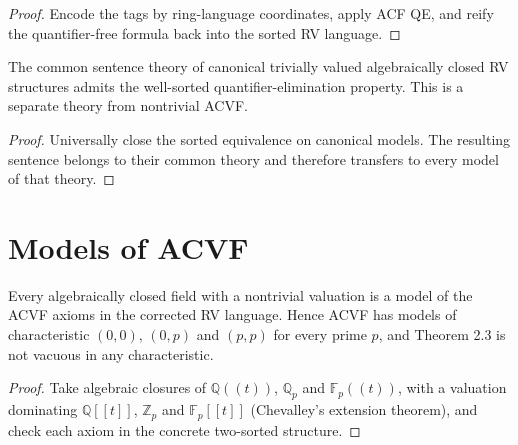 \begin{proof}


\leanok

Encode the tags by ring-language coordinates, apply ACF QE, and reify
the quantifier-free formula back into the sorted RV language.

\end{proof}

\begin{theorem}

\label{rv-trivial-theory}


\leanok

The common sentence theory of canonical trivially valued algebraically
closed RV structures admits the well-sorted quantifier-elimination property.
This is a separate theory from nontrivial ACVF.

\end{theorem}

\begin{proof}


\leanok

Universally close the sorted equivalence on canonical models. The resulting
sentence belongs to their common theory and therefore transfers to every
model of that theory.

\end{proof}

\section{Models of ACVF}

\begin{theorem}

\label{acvf-models}


\leanok

Every algebraically closed field with a nontrivial valuation is a model of
the ACVF axioms in the corrected RV language. Hence ACVF has models of
characteristic $(0,0)$, $(0,p)$ and $(p,p)$ for every prime $p$, and
Theorem 2.3 is not vacuous in any characteristic.

\end{theorem}

\begin{proof}

\leanok

Take algebraic closures of $\mathbb{Q}((t))$, $\mathbb{Q}_p$ and
$\mathbb{F}_p((t))$, with a valuation dominating $\mathbb{Q}[[t]]$,
$\mathbb{Z}_p$ and $\mathbb{F}_p[[t]]$ (Chevalley's extension theorem), and
check each axiom in the concrete two-sorted structure.

\end{proof}
